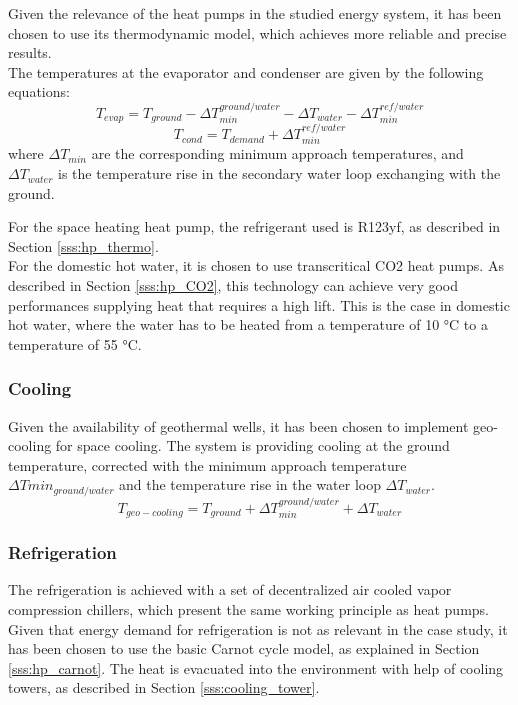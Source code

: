 \documentclass{article}
\begin{document}
Given the relevance of the heat pumps in the studied energy system, it has been chosen to use its thermodynamic model, which achieves more reliable and precise results.\\

The temperatures at the evaporator and condenser are given by the following equations:
\begin{equation}
T_{evap} = T_{ground} - \Delta T_{min}^{ground/water} - \Delta T_{water} - \Delta T_{min}^{ref/water}
\end{equation}
\begin{equation}
T_{cond} = T_{demand} + \Delta T_{min}^{ref/water}
\end{equation}
where $\Delta T_{min}$ are the corresponding minimum approach temperatures, and $\Delta T_{water}$ is the temperature rise in the secondary water loop exchanging with the ground.

For the space heating heat pump, the refrigerant used is R123yf, as described in Section \ref{sss:hp_thermo}.\\

For the domestic hot water, it is chosen to use transcritical CO2 heat pumps. As described in Section \ref{sss:hp_CO2}, this technology can achieve very good performances supplying heat that requires a high lift. This is the case in domestic hot water, where the water has to be heated from a temperature of 10 \si{\celsius} to a temperature of 55 \si{\celsius}.

\subsubsection{Cooling}
Given the availability of geothermal wells, it has been chosen to implement geo-cooling for space cooling. The system is providing cooling at the ground temperature, corrected with the minimum approach temperature $\Delta Tmin_{ground/water}$ and the temperature rise in the water loop $\Delta T_{water}$.
\begin{equation}
T_{geo-cooling} = T_{ground} + \Delta T_{min}^{ground/water} + \Delta T_{water}
\end{equation}

\subsubsection{Refrigeration}
The refrigeration is achieved with a set of decentralized air cooled vapor compression chillers, which present the same working principle as heat pumps. Given that energy demand for refrigeration is not as relevant in the case study, it has been chosen to use the basic Carnot cycle model, as explained in Section \ref{sss:hp_carnot}. The heat is evacuated into the environment with help of cooling towers, as described in Section \ref{sss:cooling_tower}.
\end{document}
